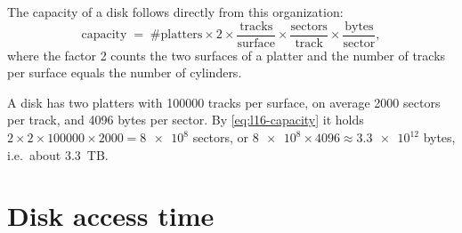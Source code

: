 \documentclass[../main.tex]{subfiles}
\begin{document}
The capacity of a disk follows directly from this organization:
\begin{equation}
  \text{capacity} \;=\; \#\text{platters} \times 2
    \times \frac{\text{tracks}}{\text{surface}}
    \times \frac{\text{sectors}}{\text{track}}
    \times \frac{\text{bytes}}{\text{sector}} ,
  \label{eq:l16-capacity}
\end{equation}
where the factor 2 counts the two surfaces of a platter and the number of
tracks per surface equals the number of cylinders.

\begin{example}
  \label{ex:l16-capacity}
  A disk has two platters with \num{100000} tracks per surface, on average
  \num{2000} sectors per track, and \num{4096} bytes per sector.  By
  \cref{eq:l16-capacity} it holds $2\times 2\times \num{100000}\times
  \num{2000} = \num{8e8}$ sectors, or $\num{8e8}\times \num{4096} \approx
  \num{3.3e12}$ bytes, i.e.\ about 3.3~TB.
\end{example}

\section{Disk access time}
\label{sec:l16-access}
\end{document}
